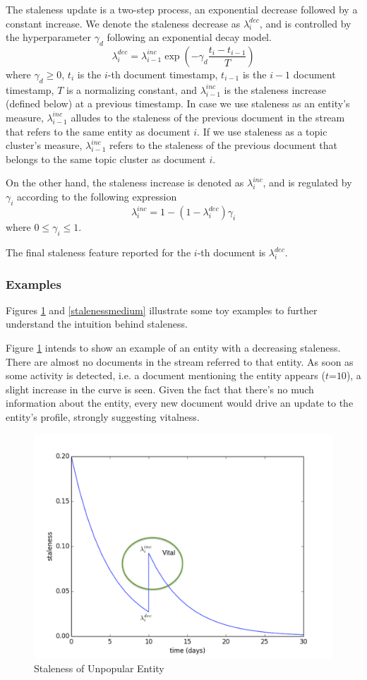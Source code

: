 \documentclass{article}
\begin{document}
The staleness update is a two-step process, an exponential decrease followed by a constant increase.
We denote the staleness decrease as $\lambda^{dec}_i$, and is controlled by the hyperparameter $\gamma_d$ following an exponential decay model.
\begin{equation}
\label{decrease}
\lambda^{dec}_i = \lambda^{inc}_{{i-1}} \exp{(-\gamma_d \frac{t_i-t_{i-1}}{T})}
\end{equation}
where $\gamma_d \geq 0$, $t_i$ is the $i$-th document timestamp, $t_{i-1}$ is the $i-1$ document timestamp, $T$ is a normalizing constant, and $\lambda^{inc}_{i-1}$ is the staleness increase (defined below) at a previous timestamp.
In case we use staleness as an entity's measure, $\lambda^{inc}_{i-1}$ alludes to the staleness of the previous document in the stream that refers to the same entity as document $i$.
If we use staleness as a topic cluster's measure, $\lambda^{inc}_{i-1}$ refers to the staleness of the previous document that belongs to the same topic cluster as document $i$.

On the other hand, the staleness increase is denoted as $\lambda^{inc}_i$, and is regulated by $\gamma_i$ according to the following expression
\begin{equation}
\lambda^{inc}_i = 1 - (1 - \lambda^{dec}_i) \gamma_i
\end{equation}
where $0 \leq \gamma_i \leq 1$.

The final staleness feature reported for the $i$-th document is $\lambda^{dec}_i$.

\subsubsection{Examples}

Figures \ref{stalenesslow} and \ref{stalenessmedium} illustrate some toy examples to further understand the intuition behind staleness.

Figure \ref{stalenesslow} intends to show an example of an entity with a decreasing staleness. There are almost no documents in the stream referred to that entity. As soon as some activity is detected, i.e. a document mentioning the entity appears ($t\mathord{=}10$), a slight increase in the curve is seen. Given the fact that there's no much information about the entity, every new document would drive an update to the entity's profile, strongly suggesting vitalness.

\begin{figure}[h!]
\centering
\includegraphics[width=.5\textwidth]{fig/staleness1.pdf}
\caption{Staleness of Unpopular Entity}
\label{stalenesslow}
\end{figure}
\end{document}
